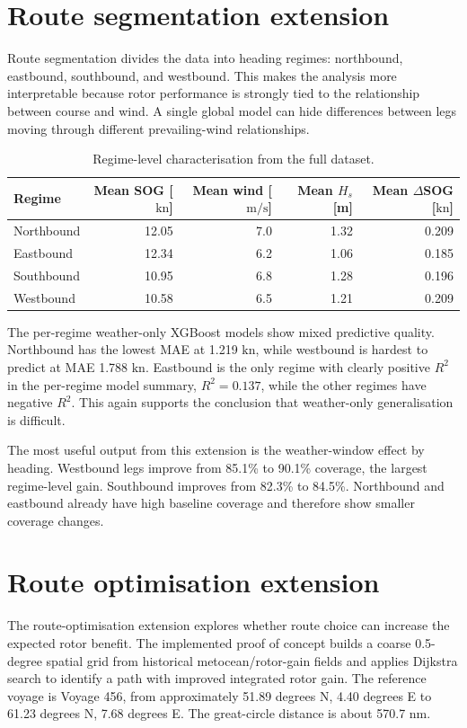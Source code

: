 \documentclass[10pt,a4paper]{article}
\newcommand{\kn}{\ensuremath{\mathrm{kn}}}
\newcommand{\ms}{\ensuremath{\mathrm{m/s}}}
\newcommand{\hs}{$H_s$}
\newcommand{\sog}{SOG}
\begin{document}
\section{Route segmentation extension}

Route segmentation divides the data into heading regimes: northbound,
eastbound, southbound, and westbound. This makes the analysis more interpretable
because rotor performance is strongly tied to the relationship between course
and wind. A single global model can hide differences between legs moving through
different prevailing-wind relationships.

\begin{table}[H]
\centering
\caption{Regime-level characterisation from the full dataset.}
\begin{tabular}{lrrrr}
\toprule
\textbf{Regime} & \textbf{Mean \sog{} [\kn]} & \textbf{Mean wind [\ms]} & \textbf{Mean \hs{} [m]} & \textbf{Mean $\Delta$\sog{} [\kn]} \\
\midrule
Northbound & 12.05 & 7.0 & 1.32 & 0.209 \\
Eastbound & 12.34 & 6.2 & 1.06 & 0.185 \\
Southbound & 10.95 & 6.8 & 1.28 & 0.196 \\
Westbound & 10.58 & 6.5 & 1.21 & 0.209 \\
\bottomrule
\end{tabular}
\end{table}

The per-regime weather-only XGBoost models show mixed predictive quality.
Northbound has the lowest MAE at 1.219 \kn{}, while westbound is hardest to
predict at MAE 1.788 \kn{}. Eastbound is the only regime with clearly positive
$R^2$ in the per-regime model summary, $R^2=0.137$, while the other regimes have
negative $R^2$. This again supports the conclusion that weather-only
generalisation is difficult.

The most useful output from this extension is the weather-window effect by
heading. Westbound legs improve from 85.1\% to 90.1\% coverage, the largest
regime-level gain. Southbound improves from 82.3\% to 84.5\%. Northbound and
eastbound already have high baseline coverage and therefore show smaller
coverage changes.

\section{Route optimisation extension}

The route-optimisation extension explores whether route choice can increase the
expected rotor benefit. The implemented proof of concept builds a coarse
0.5-degree spatial grid from historical metocean/rotor-gain fields and applies
Dijkstra search to identify a path with improved integrated rotor gain. The
reference voyage is Voyage 456, from approximately 51.89 degrees N, 4.40
degrees E to 61.23 degrees N, 7.68 degrees E. The great-circle distance is about
570.7 nm.
\end{document}
